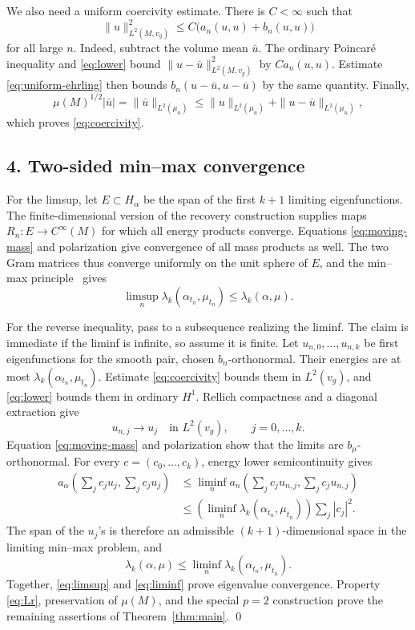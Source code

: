 \documentclass[11pt]{article}
\newcommand{\Ltwo}{L^2(M,v_g)}
\begin{document}
We also need a uniform coercivity estimate.  There is \(C<\infty\) such that
\begin{equation}\label{eq:coercivity}
 \|u\|_{\Ltwo}^2\leq C\bigl(a_n(u,u)+b_n(u,u)\bigr)
\end{equation}
for all large \(n\).  Indeed, subtract the volume mean \(\bar u\).  The
ordinary Poincar\'e inequality and \eqref{eq:lower} bound
\(\|u-\bar u\|_{\Ltwo}^2\) by \(Ca_n(u,u)\).  Estimate
\eqref{eq:uniform-ehrling} then bounds \(b_n(u-\bar u,u-\bar u)\) by the same
quantity.  Finally,
\[
 \mu(M)^{1/2}|\bar u|
 =\|\bar u\|_{L^2(\mu_n)}
 \leq\|u\|_{L^2(\mu_n)}+
       \|u-\bar u\|_{L^2(\mu_n)},
\]
which proves \eqref{eq:coercivity}.

\subsection*{4. Two-sided min--max convergence}

For the limsup, let \(E\subset H_\alpha\) be the span of the first
\(k+1\) limiting eigenfunctions.  The finite-dimensional version of the
recovery construction supplies maps \(R_n:E\to C^\infty(M)\) for which all
energy products converge.  Equations \eqref{eq:moving-mass} and polarization
give convergence of all mass products as well.  The two Gram matrices thus
converge uniformly on the unit sphere of \(E\), and the min--max
principle~\cite{Davies} gives
\begin{equation}\label{eq:limsup}
 \limsup_n\lambda_k(\alpha_{t_n},\mu_{t_n})
 \leq\lambda_k(\alpha,\mu).
\end{equation}

For the reverse inequality, pass to a subsequence realizing the liminf.  The
claim is immediate if the liminf is infinite, so assume it is finite.  Let
\(u_{n,0},\ldots,u_{n,k}\) be first eigenfunctions for the smooth pair,
chosen \(b_n\)-orthonormal.  Their energies are at most
\(\lambda_k(\alpha_{t_n},\mu_{t_n})\).  Estimate
\eqref{eq:coercivity} bounds them in \(L^2(v_g)\), and
\eqref{eq:lower} bounds them in ordinary \(H^1\).  Rellich compactness and a
diagonal extraction give
\[
 u_{n,j}\longrightarrow u_j\quad\text{in }L^2(v_g),
 \qquad j=0,\ldots,k.
\]
Equation \eqref{eq:moving-mass} and polarization show that the limits are
\(b_\mu\)-orthonormal.  For every \(c=(c_0,\ldots,c_k)\), energy lower
semicontinuity gives
\begin{align*}
 a_\alpha\left(\sum_jc_ju_j,\sum_jc_ju_j\right)
 &\leq\liminf_n
 a_n\left(\sum_jc_ju_{n,j},\sum_jc_ju_{n,j}\right)\\
 &\leq\left(\liminf_n\lambda_k(\alpha_{t_n},\mu_{t_n})\right)
       \sum_j|c_j|^2.
\end{align*}
The span of the \(u_j\)'s is therefore an admissible \((k+1)\)-dimensional
space in the limiting min--max problem, and
\begin{equation}\label{eq:liminf}
 \lambda_k(\alpha,\mu)
 \leq\liminf_n\lambda_k(\alpha_{t_n},\mu_{t_n}).
\end{equation}
Together, \eqref{eq:limsup} and \eqref{eq:liminf} prove eigenvalue
convergence.  Property \eqref{eq:Lr}, preservation of \(\mu(M)\), and the
special \(p=2\) construction prove the remaining assertions of
Theorem~\ref{thm:main}. \qed
\end{document}
